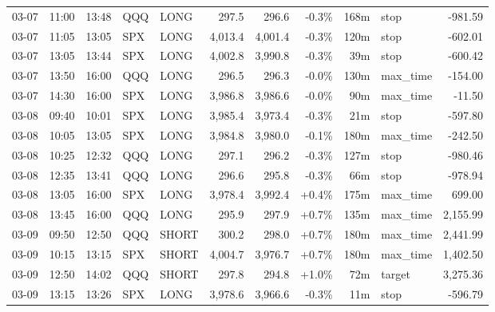 \documentclass[11pt,a4paper,twoside]{article}
\begin{document}
\begin{center}
\begin{longtable}{>{\color{txtmain}}l l l l l r r r r >{\color{txtmain}}l r}
03-07 & 11:00 & 13:48 & QQQ & LONG & 297.5 & 296.6 & \textcolor{lossred}{-0.3\%} & 168m & stop & \textcolor{lossred}{-981.59} \\
03-07 & 11:05 & 13:05 & SPX & LONG & 4,013.4 & 4,001.4 & \textcolor{lossred}{-0.3\%} & 120m & stop & \textcolor{lossred}{-602.01} \\
03-07 & 13:05 & 13:44 & SPX & LONG & 4,002.8 & 3,990.8 & \textcolor{lossred}{-0.3\%} & 39m & stop & \textcolor{lossred}{-600.42} \\
03-07 & 13:50 & 16:00 & QQQ & LONG & 296.5 & 296.3 & \textcolor{lossred}{-0.0\%} & 130m & max\_time & \textcolor{lossred}{-154.00} \\
03-07 & 14:30 & 16:00 & SPX & LONG & 3,986.8 & 3,986.6 & \textcolor{lossred}{-0.0\%} & 90m & max\_time & \textcolor{lossred}{-11.50} \\
03-08 & 09:40 & 10:01 & SPX & LONG & 3,985.4 & 3,973.4 & \textcolor{lossred}{-0.3\%} & 21m & stop & \textcolor{lossred}{-597.80} \\
03-08 & 10:05 & 13:05 & SPX & LONG & 3,984.8 & 3,980.0 & \textcolor{lossred}{-0.1\%} & 180m & max\_time & \textcolor{lossred}{-242.50} \\
03-08 & 10:25 & 12:32 & QQQ & LONG & 297.1 & 296.2 & \textcolor{lossred}{-0.3\%} & 127m & stop & \textcolor{lossred}{-980.46} \\
03-08 & 12:35 & 13:41 & QQQ & LONG & 296.6 & 295.8 & \textcolor{lossred}{-0.3\%} & 66m & stop & \textcolor{lossred}{-978.94} \\
03-08 & 13:05 & 16:00 & SPX & LONG & 3,978.4 & 3,992.4 & \textcolor{wingreen}{+0.4\%} & 175m & max\_time & \textcolor{wingreen}{699.00} \\
03-08 & 13:45 & 16:00 & QQQ & LONG & 295.9 & 297.9 & \textcolor{wingreen}{+0.7\%} & 135m & max\_time & \textcolor{wingreen}{2,155.99} \\
03-09 & 09:50 & 12:50 & QQQ & SHORT & 300.2 & 298.0 & \textcolor{wingreen}{+0.7\%} & 180m & max\_time & \textcolor{wingreen}{2,441.99} \\
03-09 & 10:15 & 13:15 & SPX & SHORT & 4,004.7 & 3,976.7 & \textcolor{wingreen}{+0.7\%} & 180m & max\_time & \textcolor{wingreen}{1,402.50} \\
03-09 & 12:50 & 14:02 & QQQ & SHORT & 297.8 & 294.8 & \textcolor{wingreen}{+1.0\%} & 72m & target & \textcolor{wingreen}{3,275.36} \\
03-09 & 13:15 & 13:26 & SPX & LONG & 3,978.6 & 3,966.6 & \textcolor{lossred}{-0.3\%} & 11m & stop & \textcolor{lossred}{-596.79} \\

\end{longtable}
\end{center}
\end{document}
